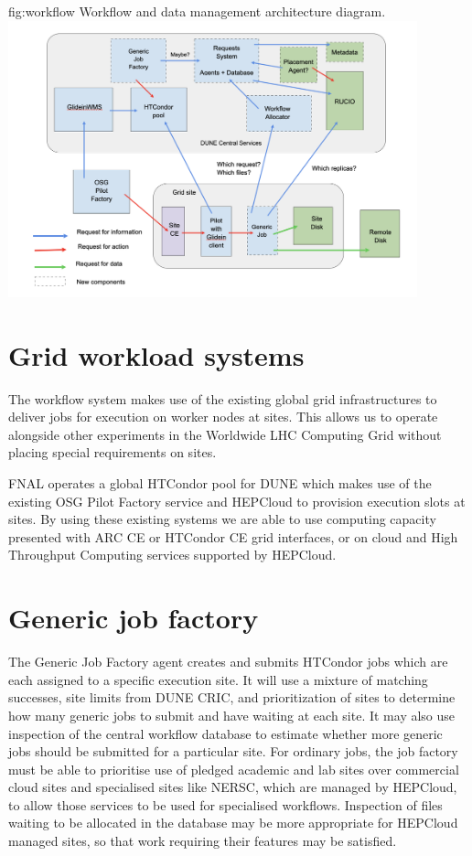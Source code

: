 \documentclass[../main-v1.tex]{subfiles}
\begin{document}
\begin{dunefigure}
{fig:workflow} 
{Workflow and data management architecture diagram.}
\includegraphics[height=8cm]{graphics/Workflow/wfs.png}
\end{dunefigure}

\section{Grid workload systems}
\label{sec:flow:grid}

The workflow system makes use of the existing global grid infrastructures to deliver jobs for execution on worker nodes at sites. This allows us to operate alongside other experiments in the Worldwide LHC Computing Grid without placing special requirements on sites.

FNAL operates a global HTCondor pool for DUNE which makes use of the existing OSG Pilot Factory service and HEPCloud to provision execution slots at sites. By using these existing systems we are able to use computing capacity presented with ARC CE or HTCondor CE grid interfaces, or on cloud and High Throughput Computing services supported by HEPCloud.

\section{Generic job factory}
\label{sec:flow:factory}

The Generic Job Factory agent creates and submits HTCondor jobs which are each assigned to a specific execution site. It will use a mixture of matching successes, site limits from DUNE CRIC, and prioritization of sites to determine how many generic jobs to submit and have waiting at each site. It may also use inspection of the central workflow database to estimate whether more generic jobs should be submitted for a particular site. For ordinary jobs, the job factory must be able to prioritise use of pledged academic and lab sites over commercial cloud sites and specialised sites like NERSC, which are managed by HEPCloud, to allow those services to be used for specialised workflows. Inspection of files waiting to be allocated in the database may be more appropriate for HEPCloud managed sites, so that work requiring their features may be satisfied.
\end{document}

